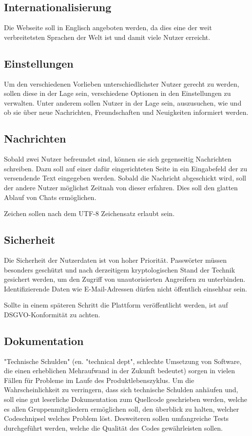 \subsection{Internationalisierung}
Die Webseite soll in Englisch angeboten werden, da dies eine der weit verbreitetsten Sprachen der Welt ist und damit viele Nutzer erreicht.

\subsection{Einstellungen}
Um den verschiedenen Vorlieben unterschiedlichster Nutzer gerecht zu werden, sollen diese in der Lage sein, verschiedene Optionen in den Einstellungen zu verwalten. Unter anderem sollen Nutzer in der Lage sein, auszusuchen, wie und ob sie über neue Nachrichten, Freundschaften und Neuigkeiten informiert werden.

\subsection{Nachrichten}
Sobald zwei Nutzer befreundet sind, können sie sich gegenseitig Nachrichten schreiben. Dazu soll auf einer dafür eingerichteten Seite in ein Eingabefeld der zu versendende Text eingegeben werden. Sobald die Nachricht abgeschickt wird, soll der andere Nutzer möglichst Zeitnah von dieser erfahren. Dies soll den glatten Ablauf von Chats ermöglichen.

Zeichen sollen nach dem UTF-8 Zeichensatz erlaubt sein.

\subsection{Sicherheit}
Die Sicherheit der Nutzerdaten ist von hoher Priorität. Passwörter müssen besonders geschützt und nach derzeitigem kryptologischen Stand der Technik gesichert werden, um den Zugriff von unautorisierten Angreifern zu unterbinden. Identifizierende Daten wie E-Mail-Adressen dürfen nicht öffentlich einsehbar sein.

Sollte in einem späteren Schritt die Plattform veröffentlicht werden, ist auf DSGVO-Konformität zu achten.

\subsection{Dokumentation}
"Technische Schulden" (en. "technical dept", schlechte Umsetzung von Software, die einen erheblichen Mehraufwand in der Zukunft bedeutet) sorgen in vielen Fällen für Probleme im Laufe des Produktlebenszyklus. Um die Wahrscheinlichkeit zu verringern, dass sich technische Schulden anhäufen und, soll eine gut leserliche Dokumentation zum Quellcode geschrieben werden, welche es allen Gruppenmitgliedern ermöglichen soll, den überblick zu halten, welcher Codeschnipsel welches Problem löst. Desweiteren sollen umfangreiche Tests durchgeführt werden, welche die Qualität des Codes gewährleisten sollen.

